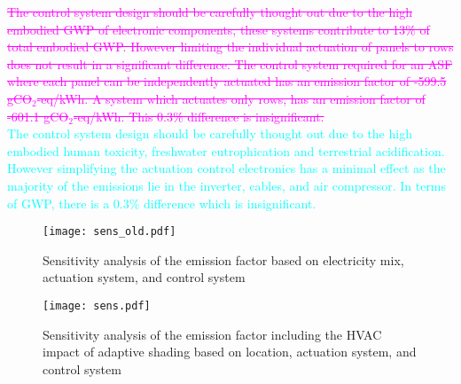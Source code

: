 \textcolor{magenta}{\sout{The control system design should be carefully thought out due to the high embodied GWP of electronic components, these systems contribute to 13\% of total embodied GWP. However limiting the individual actuation of panels to rows does not result in a significant difference. The control system required for an ASF where each panel can be independently actuated has an emission factor of -599.5 gCO$_{2}$-eq/kWh. A system which actuates only rows, has an emission factor of -601.1 gCO$_{2}$-eq/kWh. This 0.3\% difference is insignificant.\\}}
\textcolor{cyan}{The control system design should be carefully thought out due to the high embodied human toxicity, freshwater eutrophication and terrestrial acidification. However simplifying the actuation control electronics has a minimal effect as the majority of the emissions lie in the inverter, cables, and air compressor. In terms of GWP, there is a 0.3\% difference which is insignificant.}



\begin{figure}[H]
\begin{center}
\begin{mdframed}[linecolor=magenta, linewidth=2pt]
\texttt{[image: sens\_old.pdf]}
\caption{Sensitivity analysis of the emission factor based on electricity mix, actuation system, and control system}
\label{fig:sensold}
\end{mdframed}
\end{center}
\end{figure}

\begin{figure}[H]
\begin{center}
\begin{mdframed}[linecolor=cyan, linewidth=2pt]
\texttt{[image: sens.pdf]}
\caption{Sensitivity analysis of the emission factor including the HVAC impact of adaptive shading based on location, actuation system, and control system}
\label{fig:sens}
\end{mdframed}
\end{center}
\end{figure}

